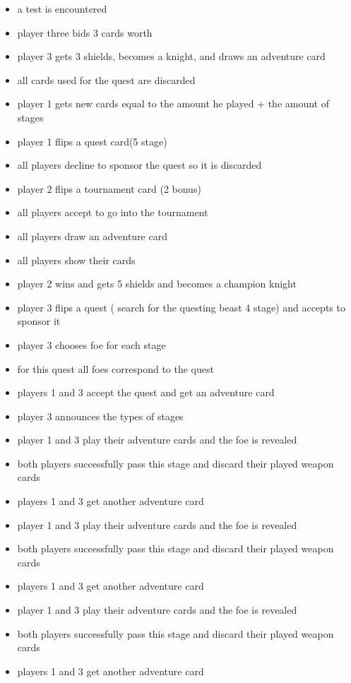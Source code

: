 \documentclass[11pt]{article}
\begin{document}
\begin{enumerate}
\begin{itemize}
	\item a test is encountered
	\item player three bids 3 cards worth
	\item player 3 gets 3 shields, becomes a knight, and draws an adventure card
	\item all cards used for the quest are discarded
	\item player 1 gets new cards equal to the amount he played + the amount of stages
	\item player 1 flips a quest card(5 stage)
	\item all players decline to sponsor the quest so it is discarded
	\item player 2 flips a tournament card (2 bonus)
	\item all players accept to go into the tournament
	\item all players draw an adventure card
	\item all players show their cards
	\item player 2 wins and gets 5 shields and becomes a champion knight
	\item player 3 flips a quest ( search for the questing beast 4 stage) and accepts to sponsor it
	\item player 3 chooses foe for each stage
	\item for this quest all foes correspond to the quest
	\item players 1 and 3 accept the quest and get an adventure card
	\item player 3 announces the types of stages
	\item player 1 and 3 play their adventure cards and the foe is revealed
	\item both players successfully pass this stage and discard their played weapon cards
	\item players 1 and 3 get another adventure card
	\item player 1 and 3 play their adventure cards and the foe is revealed
	\item both players successfully pass this stage and discard their played weapon cards
	\item players 1 and 3 get another adventure card
	\item player 1 and 3 play their adventure cards and the foe is revealed
	\item both players successfully pass this stage and discard their played weapon cards
	\item players 1 and 3 get another adventure card

\end{itemize}
\end{enumerate}
\end{document}

